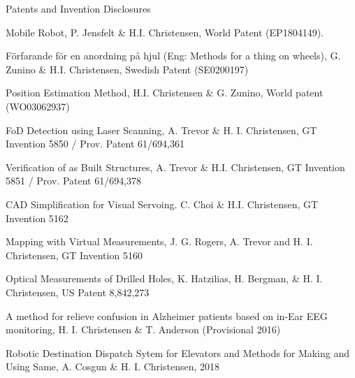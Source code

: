 \documentclass{article}
\begin{document}
\begin{cv}
	\begin{cvlist}{Patents and Invention Disclosures}
		\item Mobile Robot, P. Jensfelt \& H.I. Christensen, World Patent
		(EP1804149).
		\item F{\"o}rfarande f{\"o}r en anordning p{\aa} hjul (Eng: Methods
		for a thing on wheels), G. Zunino \& H.I. Christensen, Swedish
		Patent (SE0200197)
		\item Position Estimation Method, H.I. Christensen \& G. Zunino, World
		patent (WO03062937)
		\item FoD Detection using Laser Scanning, A. Trevor \&
		H. I. Christensen, GT Invention 5850 / Prov. Patent 61/694,361
		\item Verification of as Built Structures, A. Trevor \&
		H.I. Christensen, GT Invention 5851 / Prov. Patent 61/694,378
		\item CAD Simplification for Visual Servoing. C. Choi \&
		H.I. Christensen, GT Invention 5162
		\item Mapping with Virtual Measurements, J. G. Rogers, A. Trevor and
		H. I. Christensen, GT Invention 5160
		\item  Optical Measurements of Drilled Holes, K. Hatzilias, H. Bergman,
		\& H. I. Christensen, US Patent 8,842,273
		\item  A method for relieve confusion in Alzheimer patients based on
		in-Ear EEG monitoring, H. I. Christensen \& T. Anderson
		(Provisional 2016)
		\item Robotic Destination Dispatch Sytem for Elevators and Methods for
		Making and Using Same, A. Cosgun \& H. I. Christensen, 2018
	\end{cvlist}




\end{cv}
\end{document}
